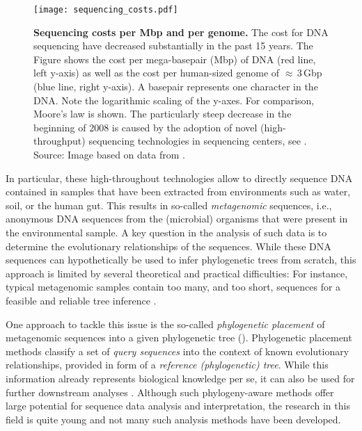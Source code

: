 \begin{figure}[hbt]
    \centering
    \texttt{[image: sequencing\_costs.pdf]}
    \caption[Sequencing costs per Mbp and per genome]{
        \textbf{Sequencing costs per Mbp and per genome.}
        The cost for DNA sequencing have decreased substantially in the past 15 years.
        The Figure shows the cost per mega-basepair (Mbp) of DNA (red line, left y-axis)
        as well as the cost per human-sized genome of $\approx$\,\num{3}\,Gbp (blue line, right y-axis).
        A basepair represents one character in the DNA.
        Note the logarithmic scaling of the y-axes.
        For comparison, Moore's law \cite{Moore1965} is shown.
        The particularly steep decrease in the beginning of 2008 is caused by
        the adoption of novel (high-throughput) sequencing technologies in sequencing centers,
        see .
        Source: Image based on data from \cite{Wetterstrand2018}.
    }
    \label{fig:sequencing_costs}
\end{figure}

In particular, these high-throughout technologies allow to directly sequence DNA contained in samples
that have been extracted from environments such as water, soil, or the human gut.
This results in so-called \emph{metagenomic} sequences,
i.e., anonymous DNA sequences from the (microbial) organisms that were present in the environmental sample.
A key question in the analysis of such data is to determine the evolutionary relationships of the sequences.
While these DNA sequences can hypothetically be used to infer phylogenetic trees from scratch,
this approach is limited by several theoretical and practical difficulties:
For instance, typical metagenomic samples contain too many, and too short, sequences
for a feasible and reliable tree inference \cite{Matsen2010}.

One approach to tackle this issue is the so-called \emph{phylogenetic placement} \cite{Matsen2010,Berger2011}
of metagenomic sequences into a given phylogenetic tree ().
Phylogenetic placement methods classify a set of \emph{query sequences}
into the context of known evolutionary relationships, provided in form of a \emph{reference (phylogenetic) tree}.
While this information already represents biological knowledge per se,
it can also be used for further downstream analyses \cite{Matsen2011a}.
Although such phylogeny-aware methods offer large potential for sequence data analysis and interpretation,
the research in this field is quite young and not many such analysis methods have been developed.

